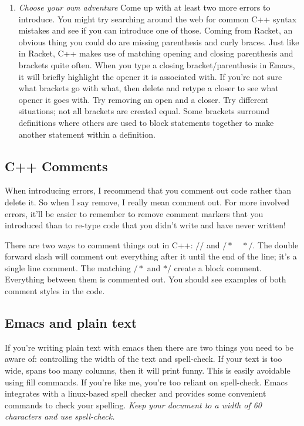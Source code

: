 \documentclass[nobib]{tufte-handout}
\begin{document}
\begin{enumerate}
\item \textit{Choose your own adventure} \newline
Come up with at least two more errors to introduce. You might try searching around the web for common C++ syntax mistakes and see if you can introduce one of those.  Coming from Racket, an obvious thing you could do are missing parenthesis and curly braces. Just like in Racket, C++ makes use of matching opening and closing parenthesis and brackets quite often. When you type a closing bracket/parenthesis in Emacs, it will briefly highlight the opener it is associated with. If you're not sure what brackets go with what, then delete and retype a closer to see what opener it goes with. Try removing an open and a closer. Try different situations; not all brackets are created equal. Some brackets surround definitions where others are used to block statements together to make another statement within a definition.
\end{enumerate}



\subsection{C++ Comments}

When introducing errors, I recommend that you comment out code rather than delete it. So when I say remove, I really mean comment out. For more involved errors, it'll be easier to remember to remove comment markers that you introduced than to re-type code that you didn't write and have never written!

There are two ways to comment things out in C++: $//$ and $/* \quad */$. The double forward slash will comment out everything after it until the end of the line; it's a single line comment. The matching $/*$ and $*/$ create a block comment. Everything between them is commented out. You should see examples of both comment styles in the code.

\subsection{Emacs and plain text}

If you're writing plain text with emacs then there are two things you need to be aware of: controlling the width of the text and spell-check. If your text is too wide, spans too many columns, then it will print funny.  This is easily avoidable using fill commands. If you're like me, you're too reliant on spell-check.  Emacs integrates with a linux-based spell checker and provides some convenient commands to check your spelling. \textit{Keep your document to a width of 60 characters and use spell-check.}
\end{document}
